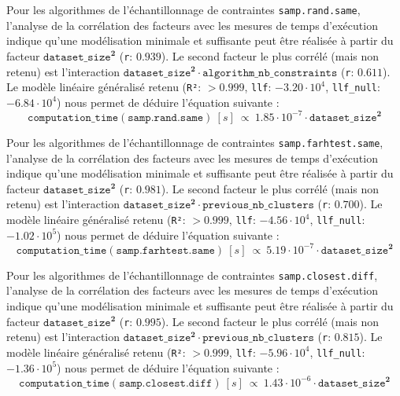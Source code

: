 			Pour les algorithmes de l'échantillonnage de contraintes \texttt{samp.rand.same}, l'analyse de la corrélation des facteurs avec les mesures de temps d'exécution indique qu'une modélisation minimale et suffisante peut être réalisée à partir du facteur $\texttt{dataset\_size}^{\textbf{2}}$ (\texttt{r}: $0.939$).
			Le second facteur le plus corrélé (mais non retenu) est l'interaction $\texttt{dataset\_size}^{\textbf{2}} \cdot \texttt{algorithm\_nb\_constraints}$ (\texttt{r}: $0.611$).
			Le modèle linéaire généralisé retenu (\texttt{R²}: $> 0.999$, \texttt{llf}: $-3.20 \cdot 10^{4}$, \texttt{llf\_null}: $-6.84 \cdot 10^{4}$) nous permet de déduire l'équation suivante :
			\begin{equation}
				\texttt{computation\_time}(\texttt{samp.rand.same})~[s]~
				\propto~1.85 \cdot 10^{-7} \cdot \texttt{dataset\_size}^{\textbf{2}}
			\end{equation}
			
			Pour les algorithmes de l'échantillonnage de contraintes \texttt{samp.farhtest.same}, l'analyse de la corrélation des facteurs avec les mesures de temps d'exécution indique qu'une modélisation minimale et suffisante peut être réalisée à partir du facteur $\texttt{dataset\_size}^{\textbf{2}}$ (\texttt{r}: $0.981$).
			Le second facteur le plus corrélé (mais non retenu) est l'interaction $\texttt{dataset\_size}^{\textbf{2}} \cdot \texttt{previous\_nb\_clusters}$ (\texttt{r}: $0.700$).
			Le modèle linéaire généralisé retenu (\texttt{R²}: $> 0.999$, \texttt{llf}: $-4.56 \cdot 10^{4}$, \texttt{llf\_null}: $-1.02 \cdot 10^{5}$) nous permet de déduire l'équation suivante :
			\begin{equation}
				\texttt{computation\_time}(\texttt{samp.farhtest.same})~[s]~
				\propto~5.19 \cdot 10^{-7} \cdot \texttt{dataset\_size}^{\textbf{2}}
			\end{equation}
			
			Pour les algorithmes de l'échantillonnage de contraintes \texttt{samp.closest.diff}, l'analyse de la corrélation des facteurs avec les mesures de temps d'exécution indique qu'une modélisation minimale et suffisante peut être réalisée à partir du facteur $\texttt{dataset\_size}^{\textbf{2}}$ (\texttt{r}: $0.995$).
			Le second facteur le plus corrélé (mais non retenu) est l'interaction $\texttt{dataset\_size}^{\textbf{2}} \cdot \texttt{previous\_nb\_clusters}$ (\texttt{r}: $0.815$).
			Le modèle linéaire généralisé retenu (\texttt{R²}: $> 0.999$, \texttt{llf}: $-5.96 \cdot 10^{4}$, \texttt{llf\_null}: $-1.36 \cdot 10^{5}$) nous permet de déduire l'équation suivante :
			\begin{equation}
				\texttt{computation\_time}(\texttt{samp.closest.diff})~[s]~
				\propto~1.43 \cdot 10^{-6} \cdot \texttt{dataset\_size}^{\textbf{2}}
			\end{equation}
			
